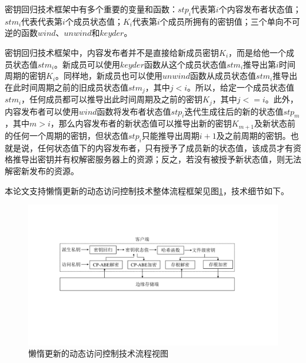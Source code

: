 \documentclass[promaster]{thesis-uestc}
\begin{document}
密钥回归技术框架中有多个重要的变量和函数：$stp_i$代表第$i$个内容发布者状态值；$stm_i$代表代表第$i$个成员状态值；$K_i$代表第$i$个成员所拥有的密钥值；三个单向不可逆的函数$wind$、$unwind$和$keyder$。


密钥回归技术框架中，内容发布者并不是直接给新成员密钥$K_i$，而是给他一个成员状态值$stm_i$。新成员可以使用$keyder$函数从这个成员状态值$stm_i$推导出第$i$时间周期的密钥$K_i$。同样地，新成员也可以使用$unwind$函数从成员状态值$stm_i$推导出在此时间周期之前的旧成员状态值$stm_j$，其中$j<i$。所以，给定一个成员状态值$stm_i$，任何成员都可以推导出此时间周期及之前的密钥$K_j$，其中$j<=i$。此外，内容发布者可以使用$wind$函数将发布者状态值$stp_i$迭代生成往后的新的状态值$stp_m$，其中$m>i$，那么内容发布者的新状态值可以推导出新的密钥$K_{m+1}$及新状态前的任何一个周期的密钥，但状态值$stp_i$只能推导出周期$i+1$及之前周期的密钥。也就是说，任何状态值下的内容发布者，只有授予了成员新的状态值，该成员才有资格推导出密钥并有权解密服务器上的资源；反之，若没有被授予新状态值，则无法解密新发布的资源。

本论文支持懒惰更新的动态访问控制技术整体流程框架见图\ref{懒惰更新的动态访问控制技术流程视图}，技术细节如下。

\begin{figure}[htbp]  %
    \centering
    \includegraphics[width = 1.0\linewidth]{pic/dongtaifangwenkonzhi.pdf}
    \caption{懒惰更新的动态访问控制技术流程视图}
    \label{懒惰更新的动态访问控制技术流程视图}
\end{figure}
\end{document}
